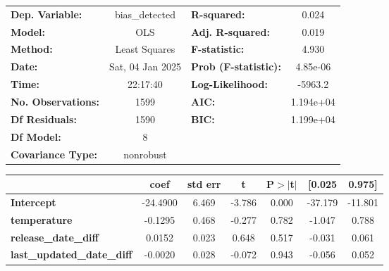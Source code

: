 \begin{center}
\begin{tabular}{lclc}
\toprule
\textbf{Dep. Variable:}                     &  bias\_detected  & \textbf{  R-squared:         } &      0.024   \\
\textbf{Model:}                             &       OLS        & \textbf{  Adj. R-squared:    } &      0.019   \\
\textbf{Method:}                            &  Least Squares   & \textbf{  F-statistic:       } &      4.930   \\
\textbf{Date:}                              & Sat, 04 Jan 2025 & \textbf{  Prob (F-statistic):} &   4.85e-06   \\
\textbf{Time:}                              &     22:17:40     & \textbf{  Log-Likelihood:    } &    -5963.2   \\
\textbf{No. Observations:}                  &        1599      & \textbf{  AIC:               } &  1.194e+04   \\
\textbf{Df Residuals:}                      &        1590      & \textbf{  BIC:               } &  1.199e+04   \\
\textbf{Df Model:}                          &           8      & \textbf{                     } &              \\
\textbf{Covariance Type:}                   &    nonrobust     & \textbf{                     } &              \\
\bottomrule
\end{tabular}
\begin{tabular}{lcccccc}
                                            & \textbf{coef} & \textbf{std err} & \textbf{t} & \textbf{P$> |$t$|$} & \textbf{[0.025} & \textbf{0.975]}  \\
\midrule
\textbf{Intercept}                          &     -24.4900  &        6.469     &    -3.786  &         0.000        &      -37.179    &      -11.801     \\
\textbf{temperature}                        &      -0.1295  &        0.468     &    -0.277  &         0.782        &       -1.047    &        0.788     \\
\textbf{release\_date\_diff}                &       0.0152  &        0.023     &     0.648  &         0.517        &       -0.031    &        0.061     \\
\textbf{last\_updated\_date\_diff}          &      -0.0020  &        0.028     &    -0.072  &         0.943        &       -0.056    &        0.052     \\

\end{tabular}
\end{center}
